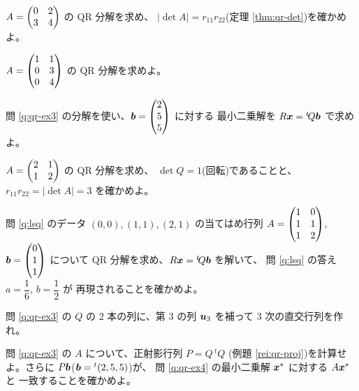 \begin{mondai}[基本]\label{q:qr-ex2}
$A = \begin{pmatrix}0 & 2 \\ 3 & 4\end{pmatrix}$ の QR 分解を求め、
$|\det A| = r_{11}r_{22}$(定理 \ref{thm:qr-det})を確かめよ。
\end{mondai}

\begin{mondai}[基本]\label{q:qr-ex3}
$A = \begin{pmatrix}1 & 1 \\ 0 & 3 \\ 0 & 4\end{pmatrix}$ の QR 分解を求めよ。
\end{mondai}

\begin{mondai}[基本]\label{q:qr-ex4}
問 \ref{q:qr-ex3} の分解を使い、$\bm{b} = \begin{pmatrix}2 \\ 5 \\ 5\end{pmatrix}$ に対する
最小二乗解を $R\bm{x} = {}^t\!Q\bm{b}$ で求めよ。
\end{mondai}

\begin{mondai}[標準]\label{q:qr-ex5}
$A = \begin{pmatrix}2 & 1 \\ 1 & 2\end{pmatrix}$ の QR 分解を求め、
$\det Q = 1$(回転)であることと、
$r_{11}r_{22} = |\det A| = 3$ を確かめよ。
\end{mondai}

\begin{mondai}[標準]\label{q:qr-ex6}
問 \ref{q:lsq} のデータ $(0,0), (1,1), (2,1)$ の当てはめ行列
$A = \begin{pmatrix}1 & 0 \\ 1 & 1 \\ 1 & 2\end{pmatrix}$, $\bm{b} = \begin{pmatrix}0 \\ 1 \\ 1\end{pmatrix}$ について
QR 分解を求め、$R\bm{x} = {}^t\!Q\bm{b}$ を解いて、
問 \ref{q:lsq} の答え $a = \dfrac{1}{6}$, $b = \dfrac{1}{2}$ が
再現されることを確かめよ。
\end{mondai}

\begin{mondai}[標準]\label{q:qr-ex7}
問 \ref{q:qr-ex3} の $Q$ の $2$ 本の列に、第 $3$ の列
$\bm{u}_3$ を補って $3$ 次の直交行列を作れ。
\end{mondai}

\begin{mondai}[標準]\label{q:qr-ex8}
問 \ref{q:qr-ex3} の $A$ について、正射影行列 $P = Q\,{}^t\!Q$
(例題 \ref{rei:qr-proj})を計算せよ。さらに
$P\bm{b}$($\bm{b} = {}^t(2, 5, 5)$)が、
問 \ref{q:qr-ex4} の最小二乗解 $\bm{x}^*$ に対する $A\bm{x}^*$ と
一致することを確かめよ。
\end{mondai}

